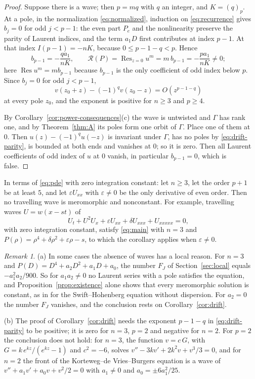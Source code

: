 \documentclass[11pt]{article}
\theoremstyle{definition}
\theoremstyle{remark}
\newtheorem{remark}[theorem]{Remark}
\numberwithin{equation}{section}
\DeclareMathOperator{\Res}{Res}
\begin{document}
\begin{proof}
Suppose there is a wave; then \(p=mq\) with \(q\) an integer, and
\(K=(q)_p\). At a pole, in the normalization \eqref{eq:normalized},
induction on \eqref{eq:recurrence} gives \(b_j=0\) for odd \(j<p-1\): the even part \(P_e\) and the
nonlinearity preserve the parity of Laurent indices, and the term
\(a_1D\) first contributes at index \(p-1\). At that index
\(I(p-1)=-nK\), because \(0\le p-1-q<p\). Hence
\[
 b_{p-1}=-\frac{qa_1}{nK},\qquad
 \mathcal R(P)=\Res_{z=0} u^m=m\,b_{p-1}=-\frac{pa_1}{nK}\ne0 ;
\]
here \(\Res u^m=mb_{p-1}\) because \(b_{p-1}\) is the only coefficient
of odd index below \(p\). Since \(b_j=0\) for odd \(j<p-1\),
\begin{equation}\label{eq:drift-parity}
 v(z_0+z)-(-1)^qv(z_0-z)=O(z^{p-1-q})
\end{equation}
at every pole \(z_0\), and the exponent is positive for \(n\ge3\) and
\(p\ge4\).

By Corollary~\ref{cor:power-consequences}(c) the wave is untwisted and
\(\Gamma\) has rank one, and by Theorem~\ref{thm:A} its poles form one
orbit of \(\Gamma\). Place one of them at \(0\). Then
\(u(z)-(-1)^qu(-z)\) is invariant under \(\Gamma\), has no poles by
\eqref{eq:drift-parity}, is bounded at both ends and vanishes at \(0\);
so it is zero. Then all Laurent coefficients of odd index of \(u\) at
\(0\) vanish, in particular \(b_{p-1}=0\), which is false.
\end{proof}

In terms of \eqref{eq:pde} with zero integration constant: let
\(n\ge3\), let the order \(p+1\) be at least \(5\), and let
\(\varepsilon U_{xx}\) with \(\varepsilon\ne0\) be the only derivative
of even order. Then no travelling wave is meromorphic and nonconstant.
For example, travelling waves \(U=w(x-st)\) of
\[
 U_t+U^2U_x+\varepsilon U_{xx}+\delta U_{xxx}+U_{xxxxx}=0,
\]
with zero integration constant, satisfy \eqref{eq:main} with \(n=3\)
and \(P(\rho)=\rho^4+\delta\rho^2+\varepsilon\rho-s\), to which the
corollary applies when \(\varepsilon\ne0\).

\begin{remark}\label{rem:drift}
(a) In some cases the absence of waves has a local reason. For \(n=3\) and
\(P(D)=D^4+a_2D^2+a_1D+a_0\), the number \(F_J\) of
Section~\ref{sec:local} equals \(-a_1^2a_2/900\). So for
\(a_1a_2\ne0\) no Laurent series with a pole satisfies the equation,
and Proposition~\ref{prop:existence} alone shows that every meromorphic
solution is constant, as in \citep{KudryashovSinelshchikov2012SH} for
the Swift--Hohenberg equation without dispersion. For \(a_2=0\) the number \(F_J\) vanishes, and the
conclusion rests on Corollary~\ref{cor:drift}.

(b) The proof of Corollary~\ref{cor:drift} needs the exponent
\(p-1-q\) in \eqref{eq:drift-parity} to be positive; it is zero for
\(n=3\), \(p=2\) and negative for \(n=2\). For \(p=2\) the conclusion
does not hold: for \(n=3\), the function \(v=c\,G\), with \(G=k\,e^{kz}/(e^{kz}-1)\)
and \(c^2=-6\), solves \(v''-3kv'+2k^2v+v^3/3=0\), and for \(n=2\) the front of the
Korteweg--de Vries--Burgers equation is a wave of
\(v''+a_1v'+a_0v+v^2/2=0\) with \(a_1\ne0\) and
\(a_0=\pm6a_1^2/25\).
\end{remark}
\end{document}
